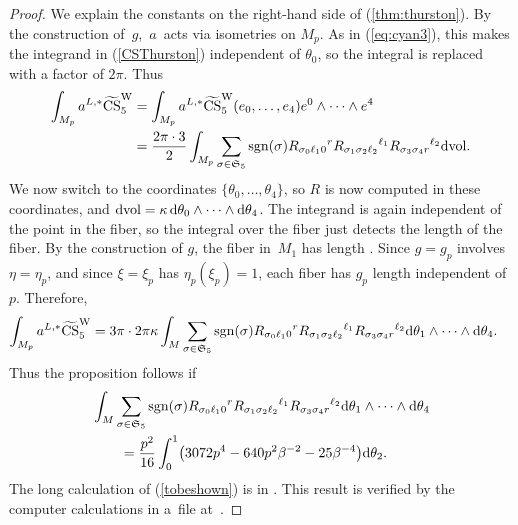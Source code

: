 \documentclass[10pt,a4paper]{amsart}
\numberwithin{equation}{section}
\theoremstyle{definition}
\newcommand{\dvol}{{\rm dvol}}
\newcommand{\be}{\eta}
\newcommand{\bxi}{\xi}
\newcommand{\br}{ R}
\newcommand{\bg}{ g}
\newcommand{\sgn}{{\rm sgn}}
\newcommand{\omp}{M_p}
\newcommand{\barcurvature}[2]{R_{#1}{}^{#2}}
\begin{document}
\begin{proof} We explain the constants on the right-hand side of (\ref{thm:thurston}). By the construction of~$\bg$,~$a$~acts via isometries on $\omp$. As in (\ref{eq:cyan3}), this makes the integrand in (\ref{CSThurston}) independent of $\theta_0$, so the integral
is replaced with a factor of $2\pi$. Thus
\begin{align*} \int_{\omp} a^{L,*}\widetilde{{\rm CS}}^{\rm W}_5 &=
 \int_{\omp} a^{L,*}\widetilde{{\rm CS}}^{\rm W}_5(e_0,\dots,e_4) e^0\wedge\cdots\wedge e^4\\
 &=\frac{2\pi\cdot 3}{2} \int_{\omp}
 \sum_{\sigma \in {\mathfrak S_5}}
\sgn(\sigma) \barcurvature{\sigma_0 \ell_1 0}{r}
\barcurvature{\sigma_1 \sigma_2 \ell_2}{\ell_1}
\barcurvature{\sigma_3\sigma_4 r}{\ell_2}\dvol.
\end{align*}
We now switch to the coordinates $\{\theta_0,\dots,\theta_4\}$, so $\br$ is now computed in these coordinates, and $\dvol = \kappa\, {\rm d}\theta_0\wedge\dots
\wedge {\rm d}\theta_4$.
The integrand is again independent of the point in the fiber, so the integral over the fiber just detects the length of the fiber. By the construction of $\bg$, the fiber in~$M_1$ has length \smash{$2\pi
=\int_0^{2\pi} |\bxi|$}.
Since
$g = g_p$ involves $\be = \be_p$, and since $\bxi = \bxi_p$ has $\be_p(\bxi_p) = 1$,
each fiber has $g_p$ length  independent of $p$. Therefore,
\begin{align*} \int_{\omp} a^{L,*}\widetilde{{\rm CS}}^{\rm W}_5 &=
3\pi\cdot 2\pi\kappa
\int_M \sum_{\sigma \in {\mathfrak S_5}}
\sgn(\sigma) \barcurvature{\sigma_0 \ell_1 0}{r}
\barcurvature{\sigma_1 \sigma_2 \ell_2}{\ell_1}
\barcurvature{\sigma_3\sigma_4 r}{\ell_2}{\rm d}\theta_1\wedge\cdots \wedge {\rm d}\theta_4.
\end{align*}
Thus the proposition
follows if
\begin{align}
&\int_M \sum_{\sigma \in {\mathfrak S_5}}
\sgn(\sigma) \barcurvature{\sigma_0 \ell_1 0}{r}
\barcurvature{\sigma_1 \sigma_2 \ell_2}{\ell_1}
\barcurvature{\sigma_3\sigma_4 r}{\ell_2}{\rm d}\theta_1\wedge\cdots \wedge {\rm d}\theta_4 \nonumber \\
&\qquad= \frac{p^2}{16} \int_0^1\bigl(3072p^4 -640p^2\beta^{-2} -25\beta^{-4}\bigr){\rm d}\theta_2.\label{tobeshown}
\end{align}
The long calculation of (\ref{tobeshown}) is in \cite{Egi3}. This result is verified by the computer calculations in a~file
at~\cite{Egi1}.
\end{proof}
\end{document}
